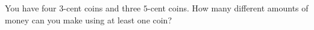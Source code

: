 You have four $3$-cent coins and three $5$-cent coins. How many different amounts of money can you make using at least one coin?
